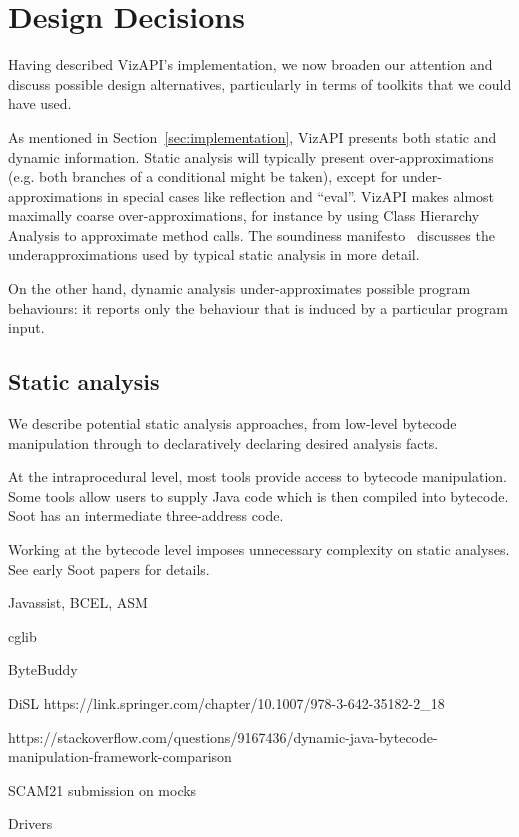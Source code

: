 \section{Design Decisions}
\label{sec:design-decisions}

Having described VizAPI's implementation, we now broaden our attention
and discuss possible design alternatives, particularly in terms of toolkits
that we could have used.

As mentioned in Section~\ref{sec:implementation}, VizAPI presents both
static and dynamic information. Static analysis will typically present
over-approximations (e.g. both branches of a conditional might be
taken), except for under-approximations in special cases like
reflection and ``eval''. VizAPI makes almost maximally coarse
over-approximations, for instance by using Class Hierarchy Analysis to
approximate method calls. The soundiness
manifesto~\cite{livshits15:_in_defen_sound} discusses the
underapproximations used by typical static analysis in more detail.

On the other hand, dynamic analysis under-approximates possible
program behaviours: it reports only the behaviour that is induced by
a particular program input. 

\subsection{Static analysis}
We describe potential static analysis approaches, from low-level
bytecode manipulation through to declaratively declaring desired
analysis facts.

At the intraprocedural level, most tools provide access to bytecode
manipulation. Some tools allow users to supply Java code which is
then compiled into bytecode. Soot has an intermediate three-address code.

Working at the bytecode level imposes unnecessary complexity on
static analyses. See early Soot papers for details.

Javassist, BCEL, ASM

cglib

ByteBuddy


DiSL https://link.springer.com/chapter/10.1007/978-3-642-35182-2_18

https://stackoverflow.com/questions/9167436/dynamic-java-bytecode-manipulation-framework-comparison



SCAM21 submission on mocks


Drivers

